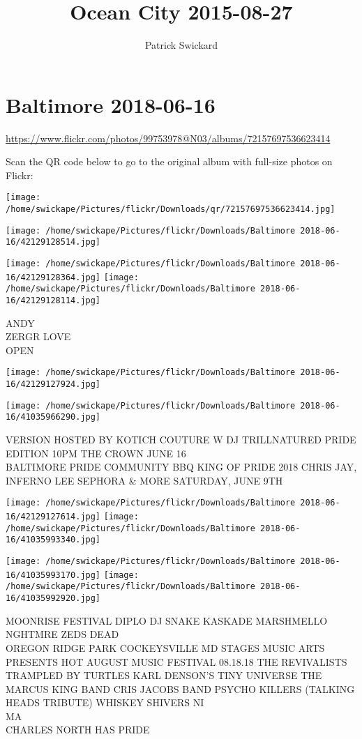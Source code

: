 \documentclass[10pt,letterpaper]{article}
\title{Ocean City 2015-08-27}
\author{Patrick Swickard}
\date{}
\begin{document}
\section*{Baltimore 2018-06-16}

\url{https://www.flickr.com/photos/99753978@N03/albums/72157697536623414}

Scan the QR code below to go to the original album with full-size photos on Flickr:

\texttt{[image: /home/swickape/Pictures/flickr/Downloads/qr/72157697536623414.jpg]}
\pagebreak

\texttt{[image: /home/swickape/Pictures/flickr/Downloads/Baltimore 2018-06-16/42129128514.jpg]}

\vspace{0.25in}
\texttt{[image: /home/swickape/Pictures/flickr/Downloads/Baltimore 2018-06-16/42129128364.jpg]}
\texttt{[image: /home/swickape/Pictures/flickr/Downloads/Baltimore 2018-06-16/42129128114.jpg]}

ANDY\\
ZERGR LOVE\\
OPEN
\pagebreak

\texttt{[image: /home/swickape/Pictures/flickr/Downloads/Baltimore 2018-06-16/42129127924.jpg]}

\vspace{0.25in}
\texttt{[image: /home/swickape/Pictures/flickr/Downloads/Baltimore 2018-06-16/41035966290.jpg]}

VERSION HOSTED BY KOTICH COUTURE W DJ TRILLNATURED PRIDE EDITION 10PM THE CROWN JUNE 16\\
BALTIMORE PRIDE COMMUNITY BBQ KING OF PRIDE 2018 CHRIS JAY, INFERNO LEE SEPHORA \& MORE SATURDAY, JUNE 9TH
\pagebreak

\texttt{[image: /home/swickape/Pictures/flickr/Downloads/Baltimore 2018-06-16/42129127614.jpg]}
\texttt{[image: /home/swickape/Pictures/flickr/Downloads/Baltimore 2018-06-16/41035993340.jpg]}

\texttt{[image: /home/swickape/Pictures/flickr/Downloads/Baltimore 2018-06-16/41035993170.jpg]}
\texttt{[image: /home/swickape/Pictures/flickr/Downloads/Baltimore 2018-06-16/41035992920.jpg]}

MOONRISE FESTIVAL DIPLO DJ SNAKE KASKADE MARSHMELLO NGHTMRE ZEDS DEAD\\
OREGON RIDGE PARK COCKEYSVILLE MD STAGES MUSIC ARTS PRESENTS HOT AUGUST MUSIC FESTIVAL 08.18.18 THE REVIVALISTS TRAMPLED BY TURTLES KARL DENSON'S TINY UNIVERSE THE MARCUS KING BAND CRIS JACOBS BAND PSYCHO KILLERS (TALKING HEADS TRIBUTE) WHISKEY SHIVERS NI\\
MA\\
CHARLES NORTH HAS PRIDE
\pagebreak
\end{document}
